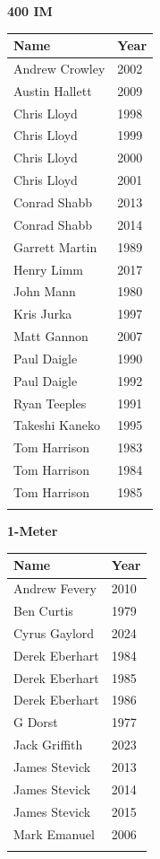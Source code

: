 \noindent\begin{minipage}[t]{0.48\textwidth}
\centering
\textbf{\textcolor{teamprimary}{400 IM}}\par
\vspace{0.5em}
\centering
\small
\renewcommand{\arraystretch}{1.0}
\setlength{\tabcolsep}{4pt}
\begin{tabular}{@{}p{3.0cm}p{1.0cm}@{}}
\toprule
\textbf{Name} & \textbf{Year} \\
\midrule
Andrew Crowley & 2002 \\
Austin Hallett & 2009 \\
Chris Lloyd & 1998 \\
Chris Lloyd & 1999 \\
Chris Lloyd & 2000 \\
Chris Lloyd & 2001 \\
Conrad Shabb & 2013 \\
Conrad Shabb & 2014 \\
Garrett Martin & 1989 \\
Henry Limm & 2017 \\
John Mann & 1980 \\
Kris Jurka & 1997 \\
Matt Gannon & 2007 \\
Paul Daigle & 1990 \\
Paul Daigle & 1992 \\
Ryan Teeples & 1991 \\
Takeshi Kaneko & 1995 \\
Tom Harrison & 1983 \\
Tom Harrison & 1984 \\
Tom Harrison & 1985 \\
\bottomrule
\vspace{0.5em}
\end{tabular}
\end{minipage}
\hfill
\begin{minipage}[t]{0.48\textwidth}
\centering
\textbf{\textcolor{teamprimary}{1-Meter}}\par
\vspace{0.5em}
\centering
\small
\renewcommand{\arraystretch}{1.0}
\setlength{\tabcolsep}{4pt}
\begin{tabular}{@{}p{3.0cm}p{1.0cm}@{}}
\toprule
\textbf{Name} & \textbf{Year} \\
\midrule
Andrew Fevery & 2010 \\
Ben Curtis & 1979 \\
Cyrus Gaylord & 2024 \\
Derek Eberhart & 1984 \\
Derek Eberhart & 1985 \\
Derek Eberhart & 1986 \\
G Dorst & 1977 \\
Jack Griffith & 2023 \\
James Stevick & 2013 \\
James Stevick & 2014 \\
James Stevick & 2015 \\
Mark Emanuel & 2006 \\
\bottomrule
\vspace{0.5em}
\end{tabular}
\end{minipage}
